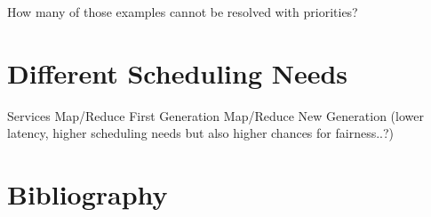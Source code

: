 \documentclass{svjour3}                     %
\begin{document}
How many of those examples cannot be resolved with priorities? 

\section{Different Scheduling Needs}

Services
Map/Reduce First Generation
Map/Reduce New Generation (lower latency, higher scheduling needs but also higher
chances for fairness..?)


\section{Bibliography}


\printbibliography



\end{document}
